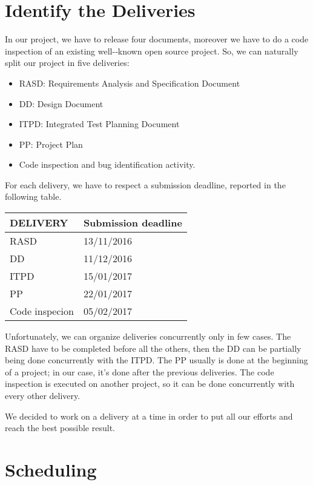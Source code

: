 \section{Identify the Deliveries}
In our project, we have to release four documents, moreover we have to do a code inspection of an existing well-­‐known open source project. So, we can naturally split our project in five deliveries:
\begin{itemize}
	\item RASD: Requirements Analysis and Specification Document
	\item DD: Design Document
	\item ITPD: Integrated Test Planning Document
	\item PP: Project Plan
	\item Code inspection and bug identification activity.
\end{itemize}

For each delivery, we have to respect a submission deadline, reported in the following table.
\begin{center}
  \begin{tabular}{ l | l }%
   	\hline
	\textbf{DELIVERY} & \textbf{Submission deadline} 
   	\\ \hline
    RASD & 13/11/2016
    \\\hline
    DD & 11/12/2016
    \\\hline
    ITPD & 15/01/2017
    \\\hline
    PP & 22/01/2017
 	\\\hline
 	Code inspecion & 05/02/2017
   	\\\hline 
  \end{tabular}
\end{center}

Unfortunately, we can organize deliveries concurrently only in few cases. The RASD have to be completed before all the others, then the DD can be partially being done concurrently with the ITPD. The PP usually is done at the beginning of a project; in our case, it's done after the previous deliveries. The code inspection is executed on another project, so it can be done concurrently with every other delivery.

We decided to work on a delivery at a time in order to put all our efforts and reach the best possible result.

\newpage
\section{Scheduling}

